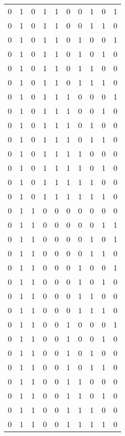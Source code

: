 \begin{longtable}[c]{rrrrrrrrrr}
        0 & 1 & 0 & 1 & 1 & 0 & 0 & 1 & 0 & 1 \\
        0 & 1 & 0 & 1 & 1 & 0 & 0 & 1 & 1 & 0 \\
        0 & 1 & 0 & 1 & 1 & 0 & 1 & 0 & 0 & 1 \\
        0 & 1 & 0 & 1 & 1 & 0 & 1 & 0 & 1 & 0 \\
        0 & 1 & 0 & 1 & 1 & 0 & 1 & 1 & 0 & 0 \\
        0 & 1 & 0 & 1 & 1 & 0 & 1 & 1 & 1 & 0 \\
        0 & 1 & 0 & 1 & 1 & 1 & 0 & 0 & 0 & 1 \\
        0 & 1 & 0 & 1 & 1 & 1 & 0 & 0 & 1 & 0 \\
        0 & 1 & 0 & 1 & 1 & 1 & 0 & 1 & 0 & 0 \\
        0 & 1 & 0 & 1 & 1 & 1 & 0 & 1 & 1 & 0 \\
        0 & 1 & 0 & 1 & 1 & 1 & 1 & 0 & 0 & 0 \\
        0 & 1 & 0 & 1 & 1 & 1 & 1 & 0 & 1 & 0 \\
        0 & 1 & 0 & 1 & 1 & 1 & 1 & 1 & 0 & 0 \\
        0 & 1 & 0 & 1 & 1 & 1 & 1 & 1 & 1 & 0 \\
        0 & 1 & 1 & 0 & 0 & 0 & 0 & 0 & 0 & 0 \\
        0 & 1 & 1 & 0 & 0 & 0 & 0 & 0 & 1 & 1 \\
        0 & 1 & 1 & 0 & 0 & 0 & 0 & 1 & 0 & 1 \\
        0 & 1 & 1 & 0 & 0 & 0 & 0 & 1 & 1 & 0 \\
        0 & 1 & 1 & 0 & 0 & 0 & 1 & 0 & 0 & 1 \\
        0 & 1 & 1 & 0 & 0 & 0 & 1 & 0 & 1 & 0 \\
        0 & 1 & 1 & 0 & 0 & 0 & 1 & 1 & 0 & 0 \\
        0 & 1 & 1 & 0 & 0 & 0 & 1 & 1 & 1 & 0 \\
        0 & 1 & 1 & 0 & 0 & 1 & 0 & 0 & 0 & 1 \\
        0 & 1 & 1 & 0 & 0 & 1 & 0 & 0 & 1 & 0 \\
        0 & 1 & 1 & 0 & 0 & 1 & 0 & 1 & 0 & 0 \\
        0 & 1 & 1 & 0 & 0 & 1 & 0 & 1 & 1 & 0 \\
        0 & 1 & 1 & 0 & 0 & 1 & 1 & 0 & 0 & 0 \\
        0 & 1 & 1 & 0 & 0 & 1 & 1 & 0 & 1 & 0 \\
        0 & 1 & 1 & 0 & 0 & 1 & 1 & 1 & 0 & 0 \\
        0 & 1 & 1 & 0 & 0 & 1 & 1 & 1 & 1 & 0 \\

\end{longtable}
